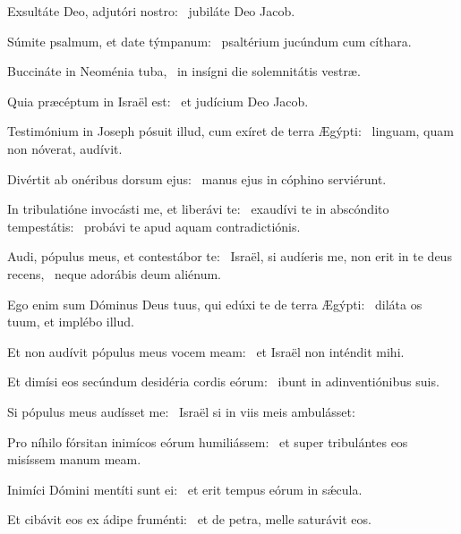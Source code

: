 \item Exsultáte Deo, adjutóri nostro:~\psstar{} jubiláte Deo Jacob.

\item Súmite psalmum, et date týmpanum:~\psstar{} psaltérium jucúndum cum cíthara.

\item Buccináte in Neoménia tuba,~\psstar{} in insígni die solemnitátis vestræ.

\item Quia præcéptum in Israël est:~\psstar{} et judícium Deo Jacob.

\item Testimónium in Joseph pósuit illud, cum exíret de terra Ægýpti:~\psstar{} linguam, quam non nóverat, audívit.

\item Divértit ab onéribus dorsum ejus:~\psstar{} manus ejus in cóphino serviérunt.

\item In tribulatióne invocásti me, et liberávi te:~\pscross{} exaudívi te in abscóndito tempestátis:~\psstar{} probávi te apud aquam contradictiónis.

\item Audi, pópulus meus, et contestábor te:~\pscross{} Israël, si audíeris me, non erit in te deus recens,~\psstar{} neque adorábis deum aliénum.

\item Ego enim sum Dóminus Deus tuus, qui edúxi te de terra Ægýpti:~\psstar{} diláta os tuum, et implébo illud.

\item Et non audívit pópulus meus vocem meam:~\psstar{} et Israël non inténdit mihi.

\item Et dimísi eos secúndum desidéria cordis eórum:~\psstar{} ibunt in adinventiónibus suis.

\item Si pópulus meus audísset me:~\psstar{} Israël si in viis meis ambulásset:

\item Pro níhilo fórsitan inimícos eórum humiliássem:~\psstar{} et super tribulántes eos misíssem manum meam.

\item Inimíci Dómini mentíti sunt ei:~\psstar{} et erit tempus eórum in sǽcula.

\item Et cibávit eos ex ádipe fruménti:~\psstar{} et de petra, melle saturávit eos.
